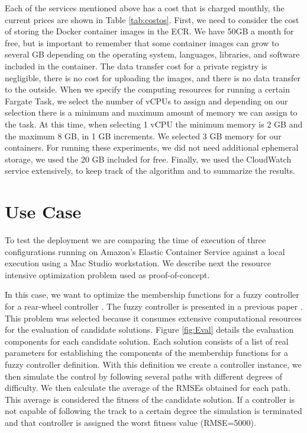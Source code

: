 \documentclass{cys}
\begin{document}
Each of the services mentioned above has a cost that is charged monthly, the current 
prices are shown in Table \ref{tab:costos}. 
First, we need to consider the cost of storing the Docker container images
in the ECR. We have 50GB a month for free, but is important to remember that
some container images can grow to several GB depending on the 
operating system, languages, libraries, and software included in the container. 
The data transfer cost for a private registry is negligible, there is no cost 
for uploading the images, and there is no data transfer to the outside. 
When we specify the computing resources for running a certain Fargate Task, we
select the number of vCPUs to assign and depending on our selection there
is a minimum and maximum amount of memory we can assign to the task.
At this time, when selecting 1 vCPU the minimum memory is 2 GB and the 
maximum 8 GB, in 1 GB increments. We selected 3 GB memory for our 
containers. For running these experiments, we did not need additional ephemeral storage,
we used the 20 GB included for free. Finally, we used the CloudWatch service extensively,
to keep track of the algorithm and to summarize the results. 

\section{Use Case}
\label{sec:use_case}

To test the deployment we are comparing the time of execution of 
three configurations running on Amazon's Elastic Container Service against 
a local execution using a Mac Studio workstation. We describe next the resource intensive 
optimization problem used as proof-of-concept.

In this case, we want to optimize the membership functions 
for a fuzzy controller for a rear-wheel controller \cite{paden_survey_2016}. 
The fuzzy controller is presented in a previous paper \cite{mancilla2022optimal}.
This problem was selected because it consumes extensive computational resources for
the evaluation of candidate solutions. Figure \ref{fig:Eval} details the evaluation
components for each candidate solution. Each solution consists of a list of real parameters 
for establishing the components of the membership functions for a fuzzy controller definition. 
With this definition we create a controller instance, we then simulate the control
by following several paths with different degrees of difficulty. We then calculate the
average of the RMSEs obtained for each path. This average is considered the fitness of 
the candidate solution. If a controller is not capable of following the track to a certain degree
the simulation is terminated and that controller is assigned the worst fitness value (RMSE=5000).
\end{document}
